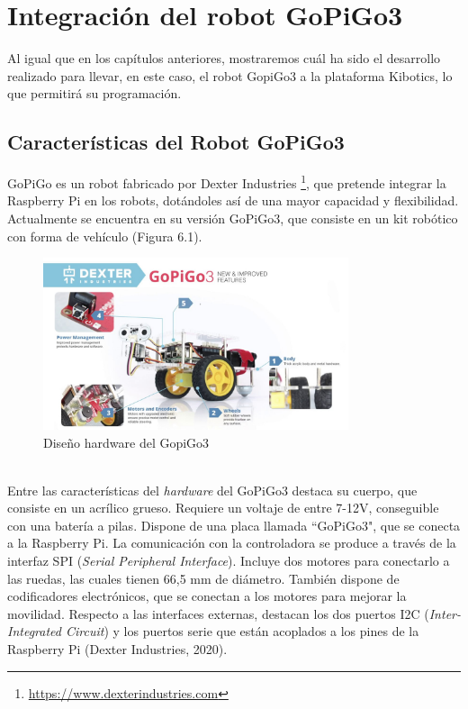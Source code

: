 \documentclass{report}
\begin{document}
\chapter{Integración del robot GoPiGo3}

Al igual que en los capítulos anteriores, mostraremos cuál ha sido el desarrollo realizado para llevar, en este caso, el robot GopiGo3 a la plataforma Kibotics, lo que permitirá su programación.

\section{Características del Robot GoPiGo3}

GoPiGo es un robot fabricado por Dexter Industries \footnote{\url{https://www.dexterindustries.com}}, que pretende integrar la Raspberry Pi en los robots, dotándoles así de una mayor capacidad y flexibilidad. Actualmente se encuentra en su versión GoPiGo3, que consiste en un kit robótico con forma de vehículo (Figura 6.1).
\\
\begin{figure}[h!]
  \centering
    \includegraphics[width=0.8\textwidth]{images/partes_GoPiGo.png}
  \caption{Diseño hardware del GopiGo3}
  \label{Diseño hardware del GopiGo3}
\end{figure}
\\
Entre las características del \textit{hardware} del GoPiGo3 destaca su cuerpo, que consiste en un acrílico grueso. Requiere un voltaje de entre 7-12V, conseguible con una batería a pilas. Dispone de una placa llamada “GoPiGo3", que se conecta a la Raspberry Pi. La comunicación con la controladora se produce a través de la interfaz SPI (\textit{Serial Peripheral Interface}). Incluye dos motores para conectarlo a las ruedas, las cuales tienen 66,5 mm de diámetro. También dispone de codificadores electrónicos, que se conectan a los motores para mejorar la movilidad. Respecto a las interfaces externas, destacan los dos puertos I2C (\textit{Inter-Integrated Circuit}) y los puertos serie que están acoplados a los pines de la Raspberry Pi (Dexter Industries, 2020).
\end{document}
